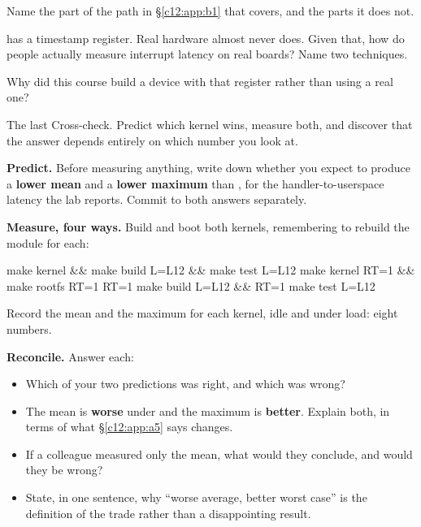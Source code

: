  Name the part of the path in \S\ref{c12:app:b1} that  covers, and the
parts it does not.

  has a timestamp register. Real hardware almost never does. Given that, how
do people actually measure interrupt latency on real boards? Name two techniques.

 Why did this course build a device with that register rather than using a real one?

\label{c12:ex:9}

The last Cross-check. Predict which kernel wins, measure both, and discover that the answer depends
entirely on which number you look at.

 \textbf{Predict.} Before measuring anything, write down whether you expect
 to produce a \textbf{lower mean} and a \textbf{lower maximum} than ,
for the handler-to-userspace latency the lab reports. Commit to both answers separately.

 \textbf{Measure, four ways.} Build and boot both kernels, remembering to rebuild the
module for each:

\begin{shell}
make kernel      && make build L=L12      && make test L=L12
make kernel RT=1 && make rootfs RT=1
RT=1 make build L=L12 && RT=1 make test L=L12
\end{shell}

\noindent Record the mean and the maximum for each kernel, idle and under load: eight numbers.

 \textbf{Reconcile.} Answer each:
\begin{itemize}
  \item Which of your two predictions was right, and which was wrong?
  \item The mean is \textbf{worse} under  and the maximum is \textbf{better}.
    Explain both, in terms of what \S\ref{c12:app:a5} says changes.
  \item If a colleague measured only the mean, what would they conclude, and would they be wrong?
  \item State, in one sentence, why ``worse average, better worst case'' is the definition of the
    trade rather than a disappointing result.
\end{itemize}

